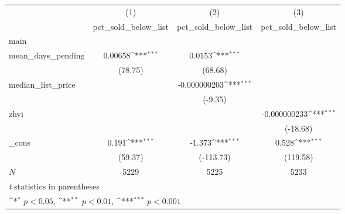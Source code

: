 {
\def\sym#1{\ifmmode^{#1}\else\(^{#1}\)\fi}
\begin{tabular}{l*{3}{c}}
\hline\hline
            &\multicolumn{1}{c}{(1)}&\multicolumn{1}{c}{(2)}&\multicolumn{1}{c}{(3)}\\
            &\multicolumn{1}{c}{pct\_sold\_below\_list}&\multicolumn{1}{c}{pct\_sold\_below\_list}&\multicolumn{1}{c}{pct\_sold\_below\_list}\\
\hline
main        &                     &                     &                     \\
mean\_days\_pending&     0.00658\sym{***}&      0.0153\sym{***}&                     \\
            &     (78.75)         &     (68.68)         &                     \\
[1em]
median\_list\_price&                     &-0.000000203\sym{***}&                     \\
            &                     &     (-9.35)         &                     \\
[1em]
zhvi        &                     &                     &-0.000000233\sym{***}\\
            &                     &                     &    (-18.68)         \\
[1em]
\_cons      &       0.191\sym{***}&      -1.373\sym{***}&       0.528\sym{***}\\
            &     (59.37)         &   (-113.73)         &    (119.58)         \\
\hline
\(N\)       &        5229         &        5225         &        5233         \\
\hline\hline
\multicolumn{4}{l}{\footnotesize \textit{t} statistics in parentheses}\\
\multicolumn{4}{l}{\footnotesize \sym{*} \(p<0.05\), \sym{**} \(p<0.01\), \sym{***} \(p<0.001\)}\\
\end{tabular}
}
